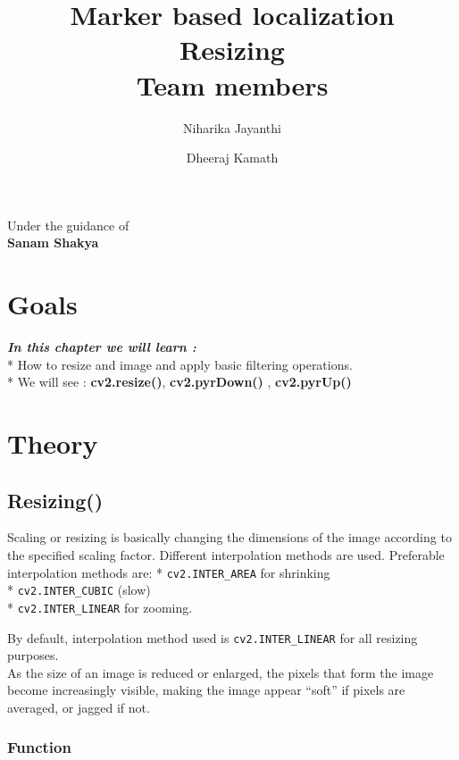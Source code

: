 \documentclass[]{article}
\date{}
\title {Marker based localization \\ [10pt]
	Resizing  \\[25pt] Team members }
\author {Niharika Jayanthi \and Dheeraj Kamath}
\begin{document}
\maketitle
\begin{center}
	\begin{large}
		Under the guidance of\\
		\textbf{Sanam Shakya}\\
		\vspace{0.5in}
	\end{large}
\end{center}

\section{Goals}\label{goals}

\emph{\textbf{In this chapter we will learn :}}\\
* How to resize and image and apply basic filtering operations.\\
* We will see : \textbf{cv2.resize()}, \textbf{cv2.pyrDown()} ,
\textbf{cv2.pyrUp()}

\section{Theory}\label{theory}

\subsection{Resizing()}\label{resizing}

Scaling or resizing is basically changing the dimensions of the image
according to the specified scaling factor. Different interpolation
methods are used. Preferable interpolation methods are: *
\texttt{cv2.INTER\_AREA} for shrinking\\
 * \texttt{cv2.INTER\_CUBIC} (slow)\\
 * \texttt{cv2.INTER\_LINEAR} for zooming.

By default, interpolation method used is \texttt{cv2.INTER\_LINEAR} for
all resizing purposes.\\
As the size of an image is reduced or enlarged, the pixels that form the
image become increasingly visible, making the image appear ``soft'' if
pixels are averaged, or jagged if not.

\subsubsection{Function}\label{function}
\end{document}
